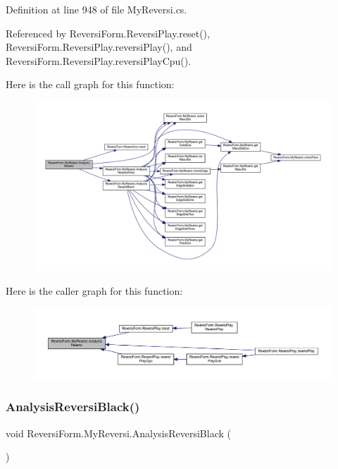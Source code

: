 Definition at line 948 of file My\+Reversi.\+cs.



Referenced by Reversi\+Form.\+Reversi\+Play.\+reset(), Reversi\+Form.\+Reversi\+Play.\+reversi\+Play(), and Reversi\+Form.\+Reversi\+Play.\+reversi\+Play\+Cpu().

Here is the call graph for this function\+:
\nopagebreak
\begin{figure}[H]
\begin{center}
\leavevmode
\includegraphics[width=350pt]{class_reversi_form_1_1_my_reversi_afc9513cbba4f973c7d1ee92e0a0f3288_cgraph}
\end{center}
\end{figure}
Here is the caller graph for this function\+:
\nopagebreak
\begin{figure}[H]
\begin{center}
\leavevmode
\includegraphics[width=350pt]{class_reversi_form_1_1_my_reversi_afc9513cbba4f973c7d1ee92e0a0f3288_icgraph}
\end{center}
\end{figure}
\mbox{\label{class_reversi_form_1_1_my_reversi_adfa9fda128ee816da9b32009326c5a15}} 
\subsubsection{\texorpdfstring{Analysis\+Reversi\+Black()}{AnalysisReversiBlack()}}
{\footnotesize\ttfamily void Reversi\+Form.\+My\+Reversi.\+Analysis\+Reversi\+Black (\begin{DoxyParamCaption}{ }\end{DoxyParamCaption})\hspace{0.3cm}{\ttfamily [private]}}



